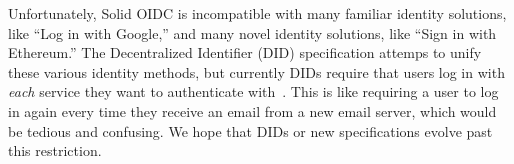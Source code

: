Unfortunately, Solid OIDC is incompatible with many familiar
identity solutions, like ``Log in with Google,''
and many novel identity solutions, like ``Sign in with Ethereum.''
The Decentralized Identifier (DID) specification attemps to unify
these various identity methods, but currently DIDs require that
users log in with \emph{each} service they want to authenticate with~\cite{dids}.
This is like requiring a user to log in again every time
they receive an email from a new email server, which would
be tedious and confusing.
We hope that DIDs or new specifications evolve past this restriction.











